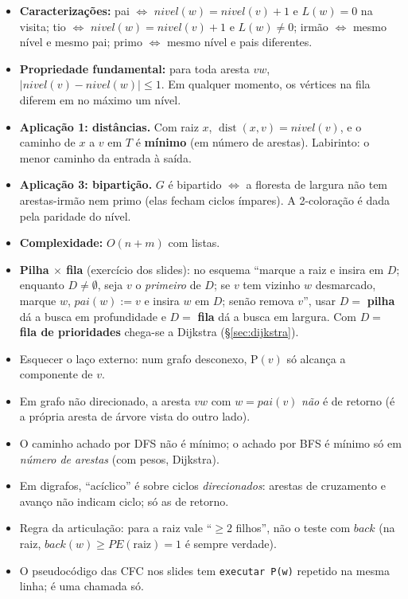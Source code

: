 \begin{itemize}
  \item \textbf{Caracterizações:} pai $\iff$ $nivel(w)=nivel(v)+1$ e $L(w)=0$ na visita; tio $\iff$ $nivel(w)=nivel(v)+1$ e $L(w)\ne0$; irmão $\iff$ mesmo nível e mesmo pai; primo $\iff$ mesmo nível e pais diferentes.
  \item \textbf{Propriedade fundamental:} para toda aresta $vw$, $|nivel(v)-nivel(w)|\le1$. Em qualquer momento, os vértices na fila diferem em no máximo um nível.
  \item \textbf{Aplicação 1: distâncias.} Com raiz $x$, $\operatorname{dist}(x,v)=nivel(v)$, e o caminho de $x$ a $v$ em $T$ é \textbf{mínimo} (em número de arestas). Labirinto: o menor caminho da entrada à saída.
  \item \textbf{Aplicação 3: bipartição.} $G$ é bipartido $\iff$ a floresta de largura não tem arestas-irmão nem primo (elas fecham ciclos ímpares). A 2-coloração é dada pela paridade do nível.
  \item \textbf{Complexidade:} $O(n+m)$ com listas.
  \item \textbf{Pilha $\times$ fila} (exercício dos slides): no esquema ``marque a raiz e insira em $D$; enquanto $D\ne\emptyset$, seja $v$ o \emph{primeiro} de $D$; se $v$ tem vizinho $w$ desmarcado, marque $w$, $pai(w):=v$ e insira $w$ em $D$; senão remova $v$'', usar $D=$ \textbf{pilha} dá a busca em profundidade e $D=$ \textbf{fila} dá a busca em largura. Com $D=$ \textbf{fila de prioridades} chega-se a Dijkstra (§\ref{sec:dijkstra}).
\end{itemize}

\begin{cuidado}
\begin{itemize}
  \item Esquecer o laço externo: num grafo desconexo, \textsc{P}$(v)$ só alcança a componente de $v$.
  \item Em grafo não direcionado, a aresta $vw$ com $w=pai(v)$ \emph{não} é de retorno (é a própria aresta de árvore vista do outro lado).
  \item O caminho achado por DFS não é mínimo; o achado por BFS é mínimo só em \emph{número de arestas} (com pesos, Dijkstra).
  \item Em digrafos, ``acíclico'' é sobre ciclos \emph{direcionados}: arestas de cruzamento e avanço não indicam ciclo; só as de retorno.
  \item Regra da articulação: para a raiz vale ``$\ge2$ filhos'', não o teste com $back$ (na raiz, $back(w)\ge PE(\text{raiz})=1$ é sempre verdade).
  \item O pseudocódigo das CFC nos slides tem \texttt{executar P(w)} repetido na mesma linha; é uma chamada só.
\end{itemize}
\end{cuidado}

